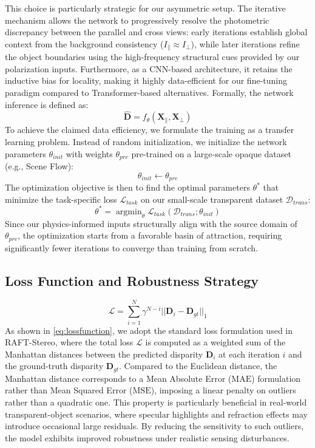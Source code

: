 \documentclass[letterpaper, 10 pt, conference]{ieeeconf}  %
\begin{document}
This choice is particularly strategic for our asymmetric setup. The iterative mechanism allows the network to progressively resolve the photometric discrepancy between the parallel and cross views: early iterations establish global context from the background consistency ($I_{\parallel} \approx I_{\perp}$), while later iterations refine the object boundaries using the high-frequency structural cues provided by our polarization inputs. Furthermore, as a CNN-based architecture, it retains the inductive bias for locality, making it highly data-efficient for our fine-tuning paradigm compared to Transformer-based alternatives. Formally, the network inference is defined as:
\begin{equation}
    \hat{\mathbf{D}} = f_\theta(\mathbf{X}_{\parallel}, \mathbf{X}_{\perp})
\end{equation}
 To achieve the claimed data efficiency, we formulate the training as a transfer learning problem. Instead of random initialization, we initialize the network parameters $\theta_{init}$ with weights $\theta_{pre}$ pre-trained on a large-scale opaque dataset (e.g., Scene Flow):
\begin{equation}
    \theta_{init} \leftarrow \theta_{pre}
\end{equation}
The optimization objective is then to find the optimal parameters $\theta^*$ that minimize the task-specific loss $\mathcal{L}_{task}$ on our small-scale transparent dataset $\mathcal{D}_{trans}$:
\begin{equation}
    \theta^* = \mathop{\arg\min}_{\theta} \mathcal{L}_{task}(\mathcal{D}_{trans}; \theta_{init})
\end{equation}
Since our physics-informed inputs structurally align with the source domain of $\theta_{pre}$, the optimization starts from a favorable basin of attraction, requiring significantly fewer iterations to converge than training from scratch.

\subsection{\textbf{Loss Function and Robustness Strategy}}

\begin{equation}
    \mathcal{L} = \sum_{i=1}^{N} \gamma^{N-i} || \mathbf{D}_i - \mathbf{D}_{gt} ||_1
    \label{eq:lossfunction}
\end{equation}
As shown in \cref{eq:lossfunction}, we adopt the standard loss formulation used in RAFT-Stereo, where the total loss $\mathcal{L}$ is computed as a weighted sum of the Manhattan distances between the predicted disparity $\mathbf{D}_i$ at each iteration $i$ and the ground-truth disparity $\mathbf{D}_{gt}$. Compared to the Euclidean distance, the Manhattan distance corresponds to a Mean Absolute Error ($\mathrm{MAE}$) formulation rather than Mean Squared Error ($\mathrm{MSE}$), imposing a {linear penalty} on outliers rather than a quadratic one. This property is particularly beneficial in real-world transparent-object scenarios, where specular highlights and refraction effects may introduce occasional large residuals. By reducing the sensitivity to such outliers, the model exhibits improved robustness under realistic sensing disturbances.
\end{document}
